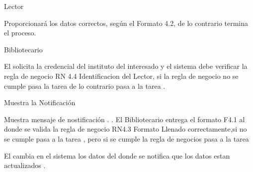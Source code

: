 \begin{PDescripcion}

  \Ppaso Lector

    \begin{enumerate}

      \Ppaso[\itarea]  Proporcionará los datos correctos, según el Formato 4.2, de lo contrario termina el proceso.
	

    \end{enumerate}
    
    
  \Ppaso Bibliotecario 

    \begin{enumerate}

      \Ppaso[\itarea]  El  solicita la credencial del instituto del  interesado y el sistema debe verificar la regla de negocio RN 4.4 Identificacion del Lector, si la regla de negocio no se cumple pasa la tarea  de lo contrario pasa a la tarea .


      \Ppaso[\itarea] Muestra la Notificación 
      
      \Ppaso[\itarea]  Muestra mensaje de nostificación .
      .
      \Ppaso[\itarea]  El Bibliotecario entrega el formato F4.1 al  donde se valida la regla de negocio RN4.3 Formato Llenado correctamente,si no se cumple pasa a la tarea , pero si se cumple la regla de negocios pasa a la tarea 
      
      
      \Ppaso[\itarea]  El  cambia en el sistema los datos del  donde se notifica que los datos estan actualizados  .

      
          \end{enumerate}

\end{PDescripcion}




